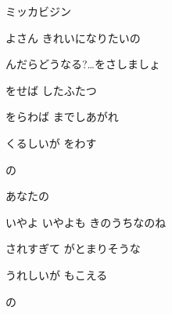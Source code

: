 \documentclass[14pt]{extreport}
\begin{document}
{   ミッカビジン
  \jisho{}

\item
  よさん きれいになりたいの
  \jisho{}

\item
  んだらどうなる?…をさしましょ
  \jisho{}

  をせば したふたつ
  \jisho{}

  をらわば までしあがれ
  \jisho{}

  くるしいが をわす
  \jisho{}

  の
  \jisho{}

\item
  あなたの 
  \jisho{}

  いやよ いやよも きのうちなのね
  \jisho{}

  されすぎて がとまりそうな
  \jisho{}

  うれしいが もこえる
  \jisho{}

  の
  \jisho{}


}
\end{document}
